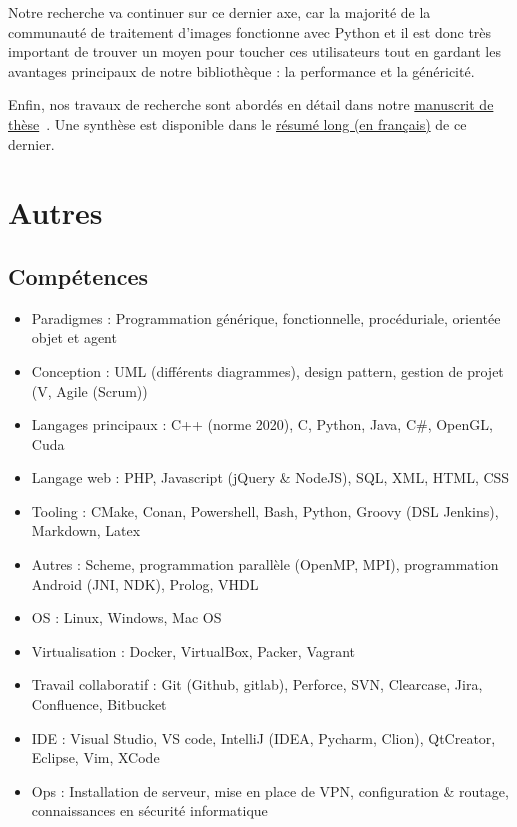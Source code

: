 \documentclass[11pt,a4paper,sans]{article} %
\begin{document}
Notre recherche va continuer sur ce dernier axe, car la majorité de la communauté de traitement d'images fonctionne avec
Python et il est donc très important de trouver un moyen pour toucher ces utilisateurs tout en gardant les avantages
principaux de notre bibliothèque : la performance et la généricité.

Enfin, nos travaux de recherche sont abordés en détail dans notre
\href{https://dutiona.github.io/thesis/manuscript.pdf}{manuscrit de thèse}~\parencite{roynard.2022.phd}. Une synthèse
est disponible dans le \href{https://dutiona.github.io/thesis/resume_long.pdf}{résumé long (en français)} de ce dernier.

\clearpage

\renewcommand{\refname}{Publications}
%
\printbibliography[heading=bibintoc]

\clearpage

\section{Autres}

\subsection{Compétences}

\begin{itemize}
  \item Paradigmes : Programmation générique, fonctionnelle, procéduriale, orientée objet et agent
  \item Conception : UML (différents diagrammes), design pattern, gestion de projet (V, Agile (Scrum))
  \item Langages principaux : C++ (norme 2020), C, Python, Java, C\#, OpenGL, Cuda
  \item Langage web : PHP, Javascript (jQuery \& NodeJS), SQL, XML, HTML, CSS
  \item Tooling : CMake, Conan, Powershell, Bash, Python, Groovy (DSL Jenkins), Markdown, Latex
  \item Autres : Scheme, programmation parallèle (OpenMP, MPI), programmation Android (JNI, NDK), Prolog, VHDL
  \item OS : Linux, Windows, Mac OS
  \item Virtualisation : Docker, VirtualBox, Packer, Vagrant
  \item Travail collaboratif : Git (Github, gitlab), Perforce, SVN, Clearcase, Jira, Confluence, Bitbucket
  \item IDE : Visual Studio, VS code, IntelliJ (IDEA, Pycharm, Clion), QtCreator, Eclipse, Vim, XCode
  \item Ops : Installation de serveur,  mise en place de VPN, configuration \& routage, connaissances en sécurité informatique
\end{itemize}
\end{document}
